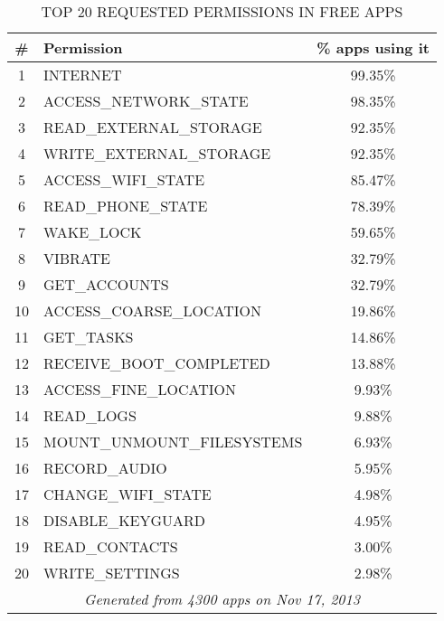 \begin{table}[ht]
    \caption{TOP 20 REQUESTED PERMISSIONS IN FREE APPS}
    \label{tab:top20-permissions}
    \centering
    \begin{tabular}{clc}
        \toprule
            \#   & Permission & \% apps using it \\
            \midrule
                1  & INTERNET                       &   99.35\% \\
                2  & ACCESS\_NETWORK\_STATE         &   98.35\% \\
                3  & READ\_EXTERNAL\_STORAGE        &   92.35\% \\
                4  & WRITE\_EXTERNAL\_STORAGE       &   92.35\% \\
                5  & ACCESS\_WIFI\_STATE            &   85.47\% \\
                6  & READ\_PHONE\_STATE             &   78.39\% \\
                7  & WAKE\_LOCK                     &   59.65\% \\
                8  & VIBRATE                        &   32.79\% \\
                9  & GET\_ACCOUNTS                  &   32.79\% \\
                10 & ACCESS\_COARSE\_LOCATION       &   19.86\% \\
                11 & GET\_TASKS                     &   14.86\% \\
                12 & RECEIVE\_BOOT\_COMPLETED       &   13.88\% \\
                13 & ACCESS\_FINE\_LOCATION         &   9.93\%  \\
                14 & READ\_LOGS                     &   9.88\%  \\
                15 & MOUNT\_UNMOUNT\_FILESYSTEMS    &   6.93\%  \\
                16 & RECORD\_AUDIO                  &   5.95\%  \\
                17 & CHANGE\_WIFI\_STATE            &   4.98\%  \\
                18 & DISABLE\_KEYGUARD              &   4.95\%  \\
                19 & READ\_CONTACTS                 &   3.00\%  \\
                20 & WRITE\_SETTINGS                &   2.98\%  \\
        \midrule
            \multicolumn{3}{c}{\footnotesize \emph{Generated from 4300 apps on Nov 17, 2013}} \\
        \bottomrule
    \end{tabular}
\end{table}

